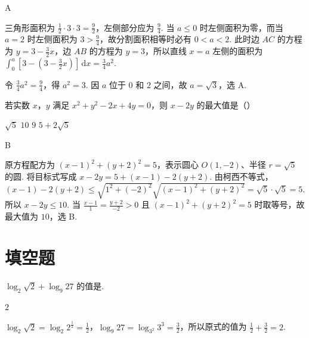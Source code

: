 \documentclass[UTF8,a4paper,oneside,11pt]{ctexbook}
\begin{document}
\begin{answer}
A
\end{answer}

\begin{solution}
三角形面积为 \(\frac{1}{2}\cdot3\cdot3=\frac{9}{2}\)，左侧部分应为 \(\frac{9}{4}\). 当 \(a\leqslant0\) 时左侧面积为零，而当 \(a=2\) 时左侧面积为 \(3>\frac{9}{4}\)，故分割面积相等时必有 \(0<a<2\). 此时边 \(AC\) 的方程为 \(y=3-\frac{3}{2}x\)，边 \(AB\) 的方程为 \(y=3\)，所以直线 \(x=a\) 左侧的面积为
\(\int_{0}^{a}\left[3-\left(3-\frac{3}{2}x\right)\right]\,\mathrm{d}x=\frac{3}{4}a^{2}\).

令 \(\frac{3}{4}a^{2}=\frac{9}{4}\)，得 \(a^{2}=3\). 因 \(a\) 位于 \(0\) 和 \(2\) 之间，故 \(a=\sqrt{3}\)，选 A.
\end{solution}

\begin{problem}

若实数 \(x\)，\(y\) 满足 \(x^{2} + y^{2} - 2x + 4y = 0\)，则 \(x - 2y\) 的最大值是（\quad）

\choices
{\(\sqrt{5} \)}
{\(10\)}
{\(9\)}
{\(5 + 2\sqrt{5} \)}
\end{problem}

\begin{answer}
B
\end{answer}

\begin{solution}
原方程配方为 \((x-1)^{2}+(y+2)^{2}=5\)，表示圆心 \(O(1,-2)\)、半径 \(r=\sqrt{5}\) 的圆. 将目标式写成
\(x-2y=5+(x-1)-2(y+2)\). 由柯西不等式，
\((x-1)-2(y+2)\leqslant\sqrt{1^{2}+(-2)^{2}}\sqrt{(x-1)^{2}+(y+2)^{2}}=\sqrt{5}\cdot\sqrt{5}=5\). 所以 \(x-2y\leqslant10\). 当 \(\frac{x-1}{1}=\frac{y+2}{-2}>0\) 且 \((x-1)^{2}+(y+2)^{2}=5\) 时取等号，故最大值为 \(10\)，选 B.
\end{solution}

\section{填空题}

\begin{problem}

\(\log_{2}\sqrt{2} + \log_{9}27 \) 的值是\fillinblank{}.
\end{problem}

\begin{answer}
\(2\)
\end{answer}

\begin{solution}
\(\log_{2}\sqrt{2}=\log_{2}2^{\frac{1}{2}}=\frac{1}{2}\)，\(\log_{9}27=\log_{3^{2}}3^{3}=\frac{3}{2}\)，所以原式的值为 \(\frac{1}{2}+\frac{3}{2}=2\).
\end{solution}
\end{document}

